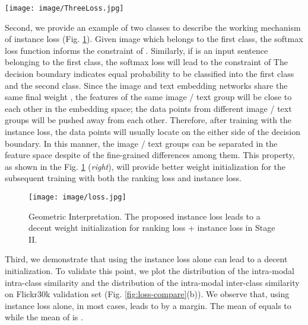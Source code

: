 \documentclass[10pt,final,journal]{IEEEtran}
\begin{document}
\begin{figure*}[t]
\begin{center}
\texttt{[image: image/ThreeLoss.jpg]}
\end{center}
   \caption{The similarity (cosine distance) distribution of the positive pairs  and negative pairs  on Flickr30k validation dataset. We show the result obtained by (a) using ranking loss alone, (b) using instance loss alone and (c) full model (instance loss + ranking loss), respectively. Indicator  is calculated as the overlapping area between  and  (defined in Section \ref{sec:instance}, lower is better). Through comparing their  values, the performance of the three methods is: ``Full Model''  ``Using Instance Loss Alone''  ``Using Ranking Loss Alone''.}
\label{fig:loss-compare}
\end{figure*}

Second, we provide an example of two classes to describe the working mechanism of instance loss (Fig. \ref{fig:loss}). 
Given image  which belongs to the first class, the softmax loss function informs the constraint of . Similarly, if  is an input sentence belonging to the first class, the softmax loss will lead to the constraint of  The decision boundary indicates equal probability to be classified into the first class and the second class. Since the image and text embedding networks share the same final weight , the features of the same image / text group will be close to each other in the embedding space; the data points from different image / text groups will be pushed away from each other. Therefore, after training with the instance loss, the data points will usually locate on the either side of the decision boundary.
In this manner, the image / text groups can be separated in the feature space despite of the fine-grained differences among them. This property,  as shown in the Fig. \ref{fig:loss} (\emph{right}), will provide better weight initialization for the subsequent training with both the ranking loss and instance loss. 

\begin{figure}[t]
 \begin{center}
\texttt{[image: image/loss.jpg]}
 \end{center}
    \caption{Geometric Interpretation. The proposed instance loss leads to a decent weight initialization for ranking loss + instance loss in Stage II.}
 \label{fig:loss}
\end{figure}

Third, we demonstrate that using the instance loss alone can lead to a decent initialization. To validate this point, we plot the distribution  of the intra-modal intra-class similarity  and the distribution  of the intra-modal inter-class similarity  on Flickr30k validation set (Fig. \ref{fig:loss-compare}(b)). 
We observe that, using instance loss alone, in most cases, leads to  by a margin. The mean of  equals to  while the mean of  is .
\end{document}
